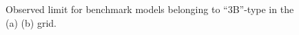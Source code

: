 \begin{figure}[h]
  \centering
    \caption{
    Observed limit for benchmark models belonging to ``3B''-type in the (a) \DMtw (b) \DMth grid.
      \label{fig::Result::combLimit::3B2} }
\end{figure}



